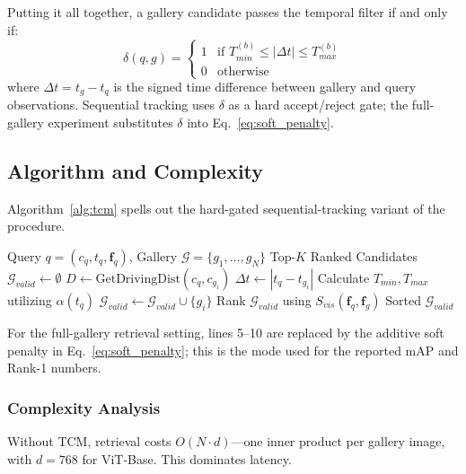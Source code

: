 \documentclass{ijitcs}
\newcommand{\rev}[1]{#1}
\begin{document}
Putting it all together, a gallery candidate passes the temporal filter if and only if:
\begin{equation}
    \delta(q, g) = \begin{cases}
        1 & \text{if } T_{min}^{(b)} \leq |\Delta t| \leq T_{max}^{(b)} \\
        0 & \text{otherwise}
    \end{cases}
\label{eq:delta}
\end{equation}
where $\Delta t = t_g - t_q$ is the signed time difference between gallery and query observations. \rev{Sequential tracking uses $\delta$ as a hard accept/reject gate; the full-gallery experiment substitutes $\delta$ into Eq.~\eqref{eq:soft_penalty}.}

\subsection{Algorithm and Complexity}
\rev{Algorithm~\ref{alg:tcm} spells out the hard-gated sequential-tracking variant of the procedure.}

\begin{algorithm}
\caption{\rev{Hard-Gated Rule-Based Temporal Consistency Filtering for Sequential Tracking}}
\label{alg:tcm}
\begin{algorithmic}[1]
\renewcommand{\algorithmicrequire}{\textbf{Input:}}
\renewcommand{\algorithmicensure}{\textbf{Output:}}
\REQUIRE Query $q=(c_q, t_q, \mathbf{f}_q)$, Gallery $\mathcal{G}=\{g_1, \dots, g_N\}$
\ENSURE Top-$K$ Ranked Candidates
\STATE $\mathcal{G}_{valid} \leftarrow \emptyset$
    \STATE $D \leftarrow \text{GetDrivingDist}(c_q, c_{g_i})$ 
    \STATE $\Delta t \leftarrow |t_q - t_{g_i}|$
    \STATE Calculate $T_{min}, T_{max}$ utilizing $\alpha(t_q)$
        \STATE $\mathcal{G}_{valid} \leftarrow \mathcal{G}_{valid} \cup \{g_i\}$
    \ENDIF
\ENDFOR
\STATE Rank $\mathcal{G}_{valid}$ using $S_{vis}(\mathbf{f}_q, \mathbf{f}_{g})$
\RETURN Sorted $\mathcal{G}_{valid}$
\end{algorithmic}
\end{algorithm}

\rev{For the full-gallery retrieval setting, lines 5--10 are replaced by the additive soft penalty in Eq.~\eqref{eq:soft_penalty}; this is the mode used for the reported mAP and Rank-1 numbers.}

\subsubsection{Complexity Analysis}
Without TCM, retrieval costs $O(N \cdot d)$---one inner product per gallery image, with $d = 768$ for ViT-Base. This dominates latency.
\end{document}
